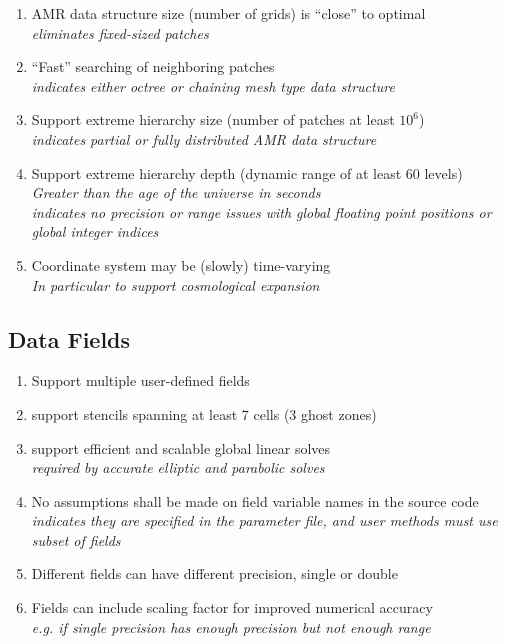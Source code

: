 \documentclass{article}
\begin{document}
\begin{enumerate}
    \item  AMR data structure size (number of grids) is ``close'' to optimal
       \\ \textit{eliminates fixed-sized patches }
    \item  ``Fast'' searching of neighboring patches
       \\ \textit{indicates either octree or chaining mesh type data structure}
    \item  Support extreme hierarchy size (number of patches at least $10^6$)
       \\ \textit{indicates partial or fully distributed AMR data structure}
    \item  Support extreme hierarchy depth (dynamic range of at least $60$ levels)
       \\ \textit{Greater than the age of the universe in seconds}
      \\  \textit{indicates no precision or range issues with global floating 
         point positions or global integer indices}
    \item Coordinate system may be (slowly) time-varying
      \\ \textit{In particular to support cosmological expansion }
\end{enumerate}

\subsection{Data Fields}

\begin{enumerate}
    \item Support multiple user-defined fields
    \item support stencils spanning at least 7 cells (3 ghost zones)
    \item support efficient and scalable global linear solves
      \\ \textit{required by accurate elliptic and parabolic solves}
    \item No assumptions shall be made on field variable names in the source
      code
      \\ \textit{indicates they are specified in the parameter file, and
        user methods must use subset of fields }
    \item Different fields can have different precision, single or double
    \item Fields can include scaling factor for improved numerical accuracy
      \\ \textit{e.g. if single precision has enough precision but not enough range }
\end{enumerate}
\end{document}
